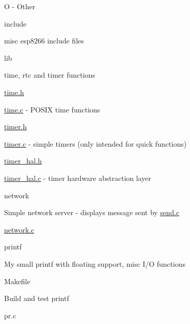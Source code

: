 \begin{DoxyItemize}
\begin{DoxyItemize}
\begin{DoxyItemize}
\begin{DoxyItemize}
\begin{DoxyItemize}
\item O -\/ Other
\end{DoxyItemize}
\end{DoxyItemize}
\end{DoxyItemize}
\end{DoxyItemize}
\item include
\begin{DoxyItemize}
\item misc esp8266 include files
\end{DoxyItemize}
\item lib
\begin{DoxyItemize}
\item time, rtc and timer functions
\begin{DoxyItemize}
\item \hyperlink{time_8h}{time.\-h}
\item \hyperlink{time_8c}{time.\-c} -\/ P\-O\-S\-I\-X time functions
\item \hyperlink{timer_8h}{timer.\-h}
\item \hyperlink{timer_8c}{timer.\-c} -\/ simple timers (only intended for quick functions)
\item \hyperlink{timer__hal_8h}{timer\-\_\-hal.\-h}
\item \hyperlink{timer__hal_8c}{timer\-\_\-hal.\-c} -\/ timer hardware abstraction layer
\end{DoxyItemize}
\end{DoxyItemize}
\item network
\begin{DoxyItemize}
\item Simple network server -\/ displays message sent by \hyperlink{send_8c}{send.\-c}
\begin{DoxyItemize}
\item \hyperlink{network_8c}{network.\-c}
\end{DoxyItemize}
\end{DoxyItemize}
\item printf
\begin{DoxyItemize}
\item My small printf with floating support, misc I/\-O functions
\begin{DoxyItemize}
\item Makefile
\begin{DoxyItemize}
\item Build and test printf
\end{DoxyItemize}
\item pr.\-c
\begin{DoxyItemize}

\end{DoxyItemize}
\end{DoxyItemize}
\end{DoxyItemize}
\end{DoxyItemize}
